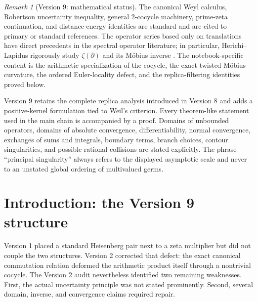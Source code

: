 \documentclass[11pt]{amsart}
\numberwithin{equation}{section}
\theoremstyle{plain}
\theoremstyle{definition}
\theoremstyle{remark}
\newtheorem{remark}[theorem]{Remark}
\begin{document}
\maketitle

\tableofcontents

\bigskip

\begin{remark}[Version 9: mathematical status]
\label{rem:status}
The canonical Weyl calculus, Robertson uncertainty inequality, general
2-cocycle machinery, prime-zeta continuation, and distance-energy identities
are standard and are cited to primary or standard references.  The operator
series based only on translations have direct precedents in the spectral
operator literature; in particular, Herichi--Lapidus rigorously study
\(\zeta(\partial)\) and its M\"obius inverse
\cite{HerichiLapidus2014}.  The notebook-specific content is the arithmetic
specialization of the cocycle, the exact twisted M\"obius curvature, the
ordered Euler-locality defect, and the replica-filtering identities proved
below.

Version 9 retains the complete replica analysis introduced in Version 8 and adds a
positive-kernel formulation tied to Weil's criterion.  Every theorem-like statement used in the main chain is
accompanied by a proof.  Domains of unbounded operators, domains of absolute
convergence, differentiability, normal convergence, exchanges of sums and
integrals, boundary terms, branch choices, contour singularities, and possible
rational collisions are stated explicitly.  The phrase ``principal
singularity'' always refers to the displayed asymptotic scale and never to an
unstated global ordering of multivalued germs.
\end{remark}

\section{Introduction: the Version 9 structure}
\label{sec:introduction}

Version 1 placed a standard Heisenberg pair next to a zeta multiplier but did
not couple the two structures.  Version 2 corrected that defect: the exact
canonical commutation relation deformed the arithmetic product itself through
a nontrivial cocycle.  The Version 2 audit nevertheless identified two
remaining weaknesses.  First, the actual uncertainty principle was not stated
prominently.  Second, several domain, inverse, and convergence claims required
repair.
\end{document}
